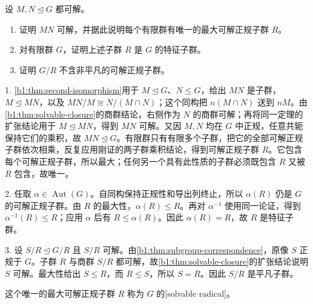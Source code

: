 \begin{exercise}\label{b1:ex:07-normal-solvable-product}
	设 \(M,N\trianglelefteq G\) 都可解。
	\begin{enumerate}
		\item 证明 \(MN\) 可解，并据此说明每个有限群有唯一的最大可解正规子群 \(R\)。
		\item 对有限群 \(G\)，证明上述子群 \(R\) 是 \(G\) 的特征子群。
		\item 证明 \(G/R\) 不含非平凡的可解正规子群。
	\end{enumerate}
\end{exercise}
\begin{solution}
	1. \cref{b1:thm:second-isomorphism}用于 \(M\trianglelefteq G\)、\(N\le G\)，给出 \(MN\) 是子群，\(M\trianglelefteq MN\)，以及 \(MN/M\cong N/(M\cap N)\)；这个同构把 \(n(M\cap N)\) 送到 \(nM\)。由\cref{b1:thm:solvable-closure}的商群结论，右侧作为 \(N\) 的商群可解；再将同一定理的扩张结论用于 \(M\trianglelefteq MN\)，得到 \(MN\) 可解。又因 \(M,N\) 均在 \(G\) 中正规，任意共轭保持它们的乘积，故 \(MN\trianglelefteq G\)。有限群只有有限多个子群，把它的全部可解正规子群依次相乘，反复应用刚证的两子群乘积结论，得到可解正规子群 \(R\)。它包含每个可解正规子群，所以最大；任何另一个具有此性质的子群必须既包含 \(R\) 又被 \(R\) 包含，故唯一。

	2. 任取 \(\alpha\in\operatorname{Aut}(G)\)。自同构保持正规性和导出列终止，所以 \(\alpha(R)\) 仍是 \(G\) 的可解正规子群。由 \(R\) 的最大性，\(\alpha(R)\leq R\)。再对 \(\alpha^{-1}\) 使用同一论证，得到 \(\alpha^{-1}(R)\leq R\)；应用 \(\alpha\) 后有 \(R\leq\alpha(R)\)。因此 \(\alpha(R)=R\)，故 \(R\) 是特征子群。

	3. 设 \(S/R\trianglelefteq G/R\) 且 \(S/R\) 可解。由\cref{b1:thm:subgroup-correspondence}，原像 \(S\) 正规于 \(G\)。子群 \(R\) 与商群 \(S/R\) 都可解，故\cref{b1:thm:solvable-closure}的扩张结论说明 \(S\) 可解。最大性给出 \(S\leq R\)，而 \(R\leq S\)，所以 \(S=R\)。因此 \(S/R\) 是平凡子群。

	这个唯一的最大可解正规子群 \(R\) 称为 \(G\) 的[solvable radical]。
\end{solution}

